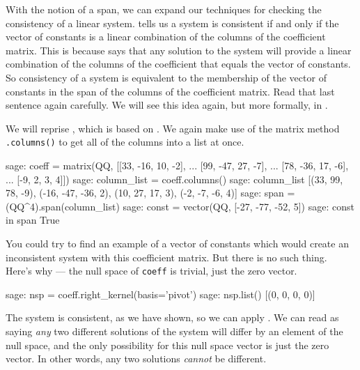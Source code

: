 With the notion of a span, we can expand our techniques for checking the consistency of a linear system.   tells us a system is consistent if and only if the vector of constants is a linear combination of the columns of the coefficient matrix.  This is because  says that any solution to the system will provide a linear combination of the columns of the coefficient that equals the vector of constants.  So consistency of a system is equivalent to the membership of the vector of constants in the span of the columns of the coefficient matrix.  Read that last sentence again carefully.  We will see this idea again, but more formally, in .\par
%
We will reprise , which is based on .  We again make use of the matrix method \texttt{.columns()} to get all of the columns into a list at once.\par
%
\begin{sageexample}
sage: coeff = matrix(QQ, [[33, -16, 10, -2],
...                       [99, -47, 27, -7],
...                       [78, -36, 17, -6],
...                       [-9,   2,  3,  4]])
sage: column_list = coeff.columns()
sage: column_list
[(33, 99, 78, -9), (-16, -47, -36, 2),
(10, 27, 17, 3), (-2, -7, -6, 4)]
sage: span = (QQ^4).span(column_list)
sage: const = vector(QQ, [-27, -77, -52, 5])
sage: const in span
True
\end{sageexample}
%
You could try to find an example of a vector of constants which would create an inconsistent system with this coefficient matrix.  But there is no such thing.  Here's why --- the null space of \verb?coeff? is trivial, just the zero vector.
%
\begin{sageexample}
sage: nsp = coeff.right_kernel(basis='pivot')
sage: nsp.list()
[(0, 0, 0, 0)]
\end{sageexample}
%
The system is consistent, as we have shown, so we can apply . We can read  as saying \emph{any} two different solutions of the system will differ by an element of the null space, and the only possibility for this null space vector is just the zero vector.  In other words, any two solutions \emph{cannot} be different.
%
\begin{sageverbatim}
\end{sageverbatim}
%
